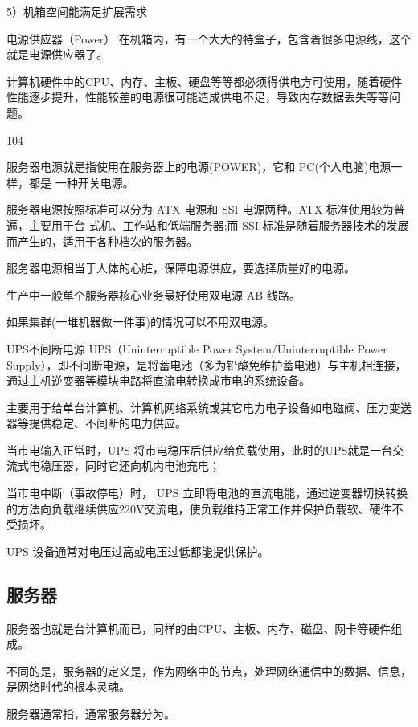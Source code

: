 5）机箱空间能满足扩展需求
\begin{ascolorbox11}{电源供应器（Power）}
在机箱内，有一个大大的特盒子，包含着很多电源线，这个就是电源供应器了。

计算机硬件中的CPU、内存、主板、硬盘等等都必须得供电方可使用，随着硬件性能逐步提升，性能较差的电源很可能造成供电不足，导致内存数据丢失等等问题。
\end{ascolorbox11}
\begin{dinglist}{104}
\item 服务器电源就是指使用在服务器上的电源(POWER)，它和 PC(个人电脑)电源一样，都是 一种开关电源。
\item 服务器电源按照标准可以分为 ATX 电源和 SSI 电源两种。ATX 标准使用较为普遍，主要用于台 式机、工作站和低端服务器;而 SSI 标准是随着服务器技术的发展而产生的，适用于各种档次的服务器。
\item 服务器电源相当于人体的心脏，保障电源供应，要选择质量好的电源。
\item 生产中一般单个服务器核心业务最好使用双电源 AB 线路。
\item 如果集群(一堆机器做一件事)的情况可以不用双电源。
\end{dinglist}
\begin{ascolorbox11}{UPS不间断电源}
UPS（Uninterruptible Power System/Uninterruptible Power Supply），即不间断电源，是将蓄电池（多为铅酸免维护蓄电池）与主机相连接，通过主机逆变器等模块电路将直流电转换成市电的系统设备。

主要用于给单台计算机、计算机网络系统或其它电力电子设备如电磁阀、压力变送器等提供稳定、不间断的电力供应。

当市电输入正常时，UPS 将市电稳压后供应给负载使用，此时的UPS就是一台交流式电稳压器，同时它还向机内电池充电；

当市电中断（事故停电）时， UPS 立即将电池的直流电能，通过逆变器切换转换的方法向负载继续供应220V交流电，使负载维持正常工作并保护负载软、硬件不受损坏。

UPS 设备通常对电压过高或电压过低都能提供保护。
\end{ascolorbox11}

\subsection{服务器}
服务器也就是台计算机而已，同样的由CPU、主板、内存、磁盘、网卡等硬件组成。

不同的是，服务器的定义是，作为网络中的节点，处理网络通信中的数据、信息，是网络时代的根本灵魂。

服务器通常指，通常服务器分为。

